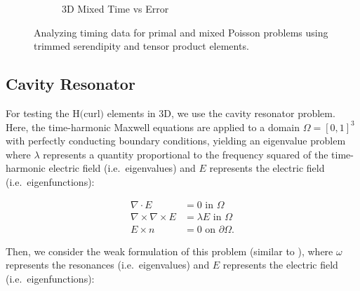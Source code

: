 \documentclass[format=acmsmall,screen,timestamp=false,a4paper]{acmart}
\begin{document}
\begin{figure}[ht]
\begin{subfigure}[h]{0.5\textwidth}
    \caption{3D Mixed Time vs Error}
    \label{fig:3dMixedTimeError}
  \end{subfigure}
  \caption{Analyzing timing data for primal and mixed Poisson problems using trimmed serendipity and tensor product elements.}
\label{fig:PrimalMixedTimeAnalysis}
\end{figure}


\newpage  
  
\newpage 



\subsection{Cavity Resonator}

For testing the H$($curl$)$ elements in 3D, we use the cavity resonator problem.  Here, the time-harmonic Maxwell equations are applied to a domain $\Omega = [0,1]^3$ with perfectly conducting boundary conditions, yielding an eigenvalue problem where $\lambda$ represents a quantity proportional to the frequency squared of the time-harmonic electric field (i.e.\ eigenvalues) and $E$ represents the electric field (i.e.\ eigenfunctions):

\begin{align}
    \nabla \cdot E &= 0 \text{ in } \Omega \\
    \nabla \times \nabla \times E &= \lambda E  \text{ in } \Omega \\
    E \times n &= 0 \text{ on } \partial \Omega.
\end{align}

Then, we consider the weak formulation of this problem (similar to \cite{fumio1987mixed}), where $\omega$ represents the resonances (i.e.\ eigenvalues) and $E$ represents the electric field (i.e.\ eigenfunctions):
\end{document}
